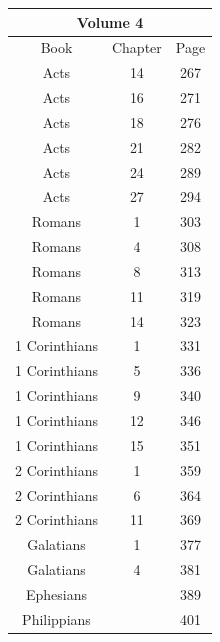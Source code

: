 \documentclass{article}
\newlength{\minipageheight}
\newlength{\minipagewidth}
\begin{document}
\begin{minipage}[l][\minipageheight][t]{\minipagewidth}%
    \begin{center}
        \renewcommand{\arraystretch}{1.0}
        \begin{tabular}{|c|c|c|}
            \hline
            \multicolumn{3}{|c|}{Volume 4}      \\
            \hline
            Book               & Chapter & Page \\
            \hline
            Acts               & 14      & 267  \\
            Acts               & 16      & 271  \\
            Acts               & 18      & 276  \\
            Acts               & 21      & 282  \\
            Acts               & 24      & 289  \\
            Acts               & 27      & 294  \\
            Romans             & 1       & 303  \\
            Romans             & 4       & 308  \\
            Romans             & 8       & 313  \\
            Romans             & 11      & 319  \\
            Romans             & 14      & 323  \\
            1 Corinthians      & 1       & 331  \\
            1 Corinthians      & 5       & 336  \\
            1 Corinthians      & 9       & 340  \\
            1 Corinthians      & 12      & 346  \\
            1 Corinthians      & 15      & 351  \\
            2 Corinthians      & 1       & 359  \\
            2 Corinthians      & 6       & 364  \\
            2 Corinthians      & 11      & 369  \\
            Galatians          & 1       & 377  \\
            Galatians          & 4       & 381  \\
            Ephesians          &         & 389  \\
            Philippians        &         & 401  \\

\end{tabular}
\end{center}
\end{minipage}
\end{document}
